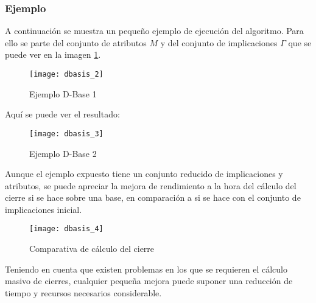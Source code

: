 \subsubsection{Ejemplo}
A continuaci\'on se muestra un peque\~no ejemplo de ejecuci\'on del algoritmo. Para ello se parte del conjunto de atributos \(M\) y del conjunto de implicaciones \(\Gamma\) que se puede ver en la imagen \ref{fig:dbasis_2}.
\begin{figure}[H]
    \centering
    \texttt{[image: dbasis\_2]}
    \caption{Ejemplo D-Base 1}
    \label{fig:dbasis_2}
\end{figure} 
Aqu\'i se puede ver el resultado:
\begin{figure}[H]
    \centering
    \texttt{[image: dbasis\_3]}
    \caption{Ejemplo D-Base 2}
    \label{fig:dbasis_3}
\end{figure} 
Aunque el ejemplo expuesto tiene un conjunto reducido de implicaciones y atributos, se puede apreciar la mejora de rendimiento a la hora del c\'alculo del cierre si se hace sobre una base, en comparaci\'on a si se hace con el conjunto de implicaciones inicial.
\begin{figure}[H]
    \centering
    \texttt{[image: dbasis\_4]}
    \caption{Comparativa de c\'alculo del cierre}
    \label{fig:dbasis_4}
\end{figure} 

Teniendo en cuenta que existen problemas en los que se requieren el c\'alculo masivo de cierres, cualquier peque\~na mejora puede suponer una reducci\'on de tiempo y recursos necesarios considerable.